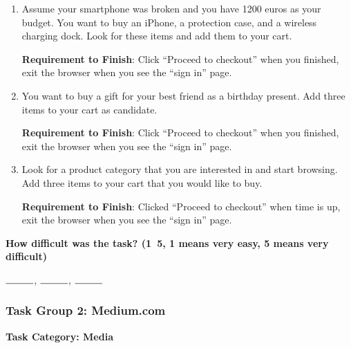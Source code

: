 \begin{enumerate}
    \item Assume your smartphone was broken and you have 1200 euros 
          as your budget. You want to buy an iPhone, a protection case, and a wireless 
          charging dock. Look for these items and add them to your cart.

          \textbf{Requirement to Finish}: Click ``Proceed to checkout'' when you finished, exit the browser when you see the ``sign in'' page.
    \item You want to buy a gift for your best friend as a birthday present.
          Add three items to your cart as candidate.
    
          \textbf{Requirement to Finish}: Click ``Proceed to checkout'' when you finished, exit the browser when you see the ``sign in'' page.
    \item Look for a product category that you are interested in and start browsing. Add three items to your cart that you would like to buy. 
           
          \textbf{Requirement to Finish}: Clicked ``Proceed to checkout'' when time is up, exit the browser when you see the ``sign in'' page.
\end{enumerate}

\textbf{How difficult was the task? (1~5, 1 means very easy, 5 means very difficult)}

$\rule{1cm}{0.15mm}$, $\rule{1cm}{0.15mm}$, $\rule{1cm}{0.15mm}$

\subsubsection{Task Group 2: Medium.com}

\textbf{Task Category: Media}

